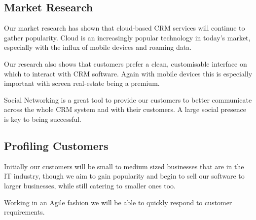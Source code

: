 \documentclass[DIV=calc, paper=a4, fontsize=11pt]{scrartcl}	 %
\begin{document}
\subsection{Market Research}
Our market research has shown that cloud-based CRM services will continue to gather popularity.
Cloud is an increasingly popular technology in today's market, especially with the influx of
mobile devices and roaming data.

Our research also shows that customers prefer a clean, customisable interface on which to interact
with CRM software. Again with mobile devices this is especially important with screen real-estate
being a premium.

Social Networking is a great tool to provide our customers to better communicate across the whole
CRM system and with their customers. A large social presence is key to being successful.

\subsection{Profiling Customers}
Initially our customers will be small to medium sized businesses that are in the IT industry, 
though we aim to gain popularity and begin to sell our software to larger businesses, while still
catering to smaller ones too.

Working in an Agile fashion we will be able to quickly respond to customer requirements.
\end{document}
